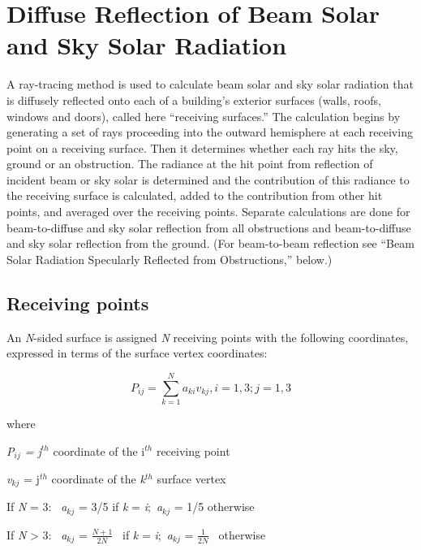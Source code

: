 \section{Diffuse Reflection of Beam Solar and Sky Solar Radiation}\label{diffuse-reflection-of-beam-solar-and-sky-solar-radiation}

A ray-tracing method is used to calculate beam solar and sky solar radiation that is diffusely reflected onto each of a building's exterior surfaces (walls, roofs, windows and doors), called here ``receiving surfaces.'' The calculation begins by generating a set of rays proceeding into the outward hemisphere at each receiving point on a receiving surface. Then it determines whether each ray hits the sky, ground or an obstruction. The radiance at the hit point from reflection of incident beam or sky solar is determined and the contribution of this radiance to the receiving surface is calculated, added to the contribution from other hit points, and averaged over the receiving points. Separate calculations are done for beam-to-diffuse and sky solar reflection from all obstructions and beam-to-diffuse and sky solar reflection from the ground. (For beam-to-beam reflection see ``Beam Solar Radiation Specularly Reflected from Obstructions,'' below.)

\subsection{Receiving points}\label{receiving-points}

An \emph{N}-sided surface is assigned \emph{N} receiving points with the following coordinates, expressed in terms of the surface vertex coordinates:

\begin{equation}
{P_{ij}} = \sum\limits_{k = 1}^N {{a_{ki}}{v_{kj}},{\mathrm{  }}i = 1,3;{\mathrm{  }}j = 1,3}
\end{equation}

where

\emph{P\(_{ij}\) = j\(^{th}\)} coordinate of the i\(^{th}\) receiving point

\emph{v\(_{kj}\)} = j\(^{th}\) coordinate of the \emph{k\(^{th}\)} surface vertex

If \emph{N} = 3:~ \emph{a\(_{kj}\)} = 3/5 if \emph{k} = \emph{i};~\emph{a\(_{kj}\)} = 1/5 otherwise

If \emph{N} \textgreater{} 3:~ \emph{a\(_{kj}\)} = \(\frac{{N + 1}}{{2N}}\) ~if \emph{k} = \emph{i};~\emph{a\(_{kj}\)} = \(\frac{1}{{2N}}\) ~otherwise

